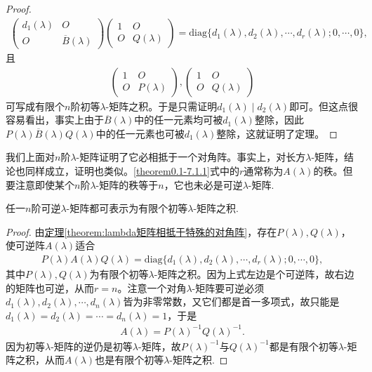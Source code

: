 \documentclass[../../main.tex]{subfiles}%
\begin{document}
\begin{proof}
\begin{align*}
\begin{pmatrix}
d_1(\lambda)&O\\
O&\overline{B}(\lambda)
\end{pmatrix}
\begin{pmatrix}
1&O\\
O&Q(\lambda)
\end{pmatrix}
=\mathrm{diag}\{d_1(\lambda),d_2(\lambda),\cdots,d_r(\lambda);0,\cdots,0\},
\end{align*}
且
\begin{align*}
\begin{pmatrix}
1&O\\
O&P(\lambda)
\end{pmatrix},
\begin{pmatrix}
1&O\\
O&Q(\lambda)
\end{pmatrix}
\end{align*}
可写成有限个$n$阶初等$\lambda$-矩阵之积。于是只需证明$d_1(\lambda)\mid d_2(\lambda)$即可。但这点很容易看出，事实上由于$\overline{B}(\lambda)$中的任一元素均可被$d_1(\lambda)$整除，因此$P(\lambda)\overline{B}(\lambda)Q(\lambda)$中的任一元素也可被$d_1(\lambda)$整除，这就证明了定理。

\end{proof}
\begin{remark}
我们上面对$n$阶$\lambda$-矩阵证明了它必相抵于一个对角阵。事实上，对长方$\lambda$-矩阵，结论也同样成立，证明也类似。\eqref{theorem0.1-7.1.1}式中的$r$通常称为$A(\lambda)$的秩。但要注意即使某个$n$阶$\lambda$-矩阵的秩等于$n$，它也未必是可逆$\lambda$-矩阵.
\end{remark}

\begin{corollary}
任一$n$阶可逆$\lambda$-矩阵都可表示为有限个初等$\lambda$-矩阵之积.
\end{corollary}
\begin{proof}

由\hyperref[theorem:lambda矩阵相抵于特殊的对角阵]{定理\ref{theorem:lambda矩阵相抵于特殊的对角阵}}，存在$P(\lambda),Q(\lambda)$，使可逆阵$A(\lambda)$适合
\begin{align*}
P(\lambda)A(\lambda)Q(\lambda)=\mathrm{diag}\{d_1(\lambda),d_2(\lambda),\cdots,d_r(\lambda);0,\cdots,0\},
\end{align*}
其中$P(\lambda),Q(\lambda)$为有限个初等$\lambda$-矩阵之积。因为上式左边是个可逆阵，故右边的矩阵也可逆，从而$r = n$。注意一个对角$\lambda$-矩阵要可逆必须$d_1(\lambda),d_2(\lambda),\cdots,d_n(\lambda)$皆为非零常数，又它们都是首一多项式，故只能是$d_1(\lambda)=d_2(\lambda)=\cdots=d_n(\lambda)=1$，于是
\begin{align*}
A(\lambda)=P(\lambda)^{-1}Q(\lambda)^{-1}.
\end{align*}
因为初等$\lambda$-矩阵的逆仍是初等$\lambda$-矩阵，故$P(\lambda)^{-1}$与$Q(\lambda)^{-1}$都是有限个初等$\lambda$-矩阵之积，从而$A(\lambda)$也是有限个初等$\lambda$-矩阵之积. 

\end{proof}
\end{document}
